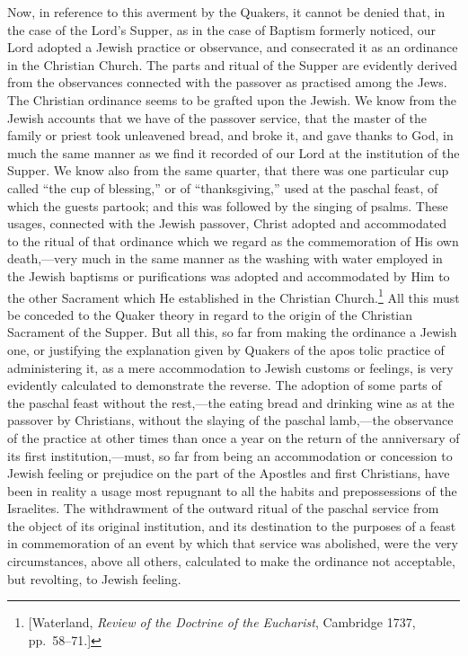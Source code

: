 \documentclass[english,]{book}
\begin{document}
Now, in reference to this averment by the Quakers, it cannot be denied that, in the case of the Lord's Supper, as in the case of Baptism formerly noticed, our Lord adopted a Jewish practice or observance, and consecrated it as an ordinance in the Christian Church. The parts and ritual of the Supper are evidently derived from the observances connected with the passover as practised among the Jews. The Christian ordinance seems to be grafted upon the Jewish. We know from the Jewish accounts that we have of the passover service, that the master of the family or priest took unleavened bread, and broke it, and gave thanks to God, in much the same manner as we find it recorded of our Lord at the institution of the Supper. We know also from the same quarter, that there was one particular cup called ``the cup of blessing,'' or of ``thanksgiving,'' used at the paschal feast, of which the guests partook; and this was followed by the singing of psalms. These usages, connected with the Jewish passover, Christ adopted and accommodated to the ritual of that ordinance which we regard as the commemoration of His own death,---very much in the same manner as the washing with water employed in the Jewish baptisms or purifications was adopted and accommodated by Him to the other Sacrament which He established in the Christian Church.\footnote{{[}Waterland, \emph{Review of the Doctrine of the Eucharist}, Cambridge 1737, pp.~58--71.{]}} All this must be conceded to the Quaker theory in regard to the origin of the Christian Sacrament of the Supper. But all this, so far from making the ordinance a Jewish one, or justifying the explanation given by Quakers of the apos tolic practice of administering it, as a mere accommodation to Jewish customs or feelings, is very evidently calculated to demonstrate the reverse. The adoption of some parts of the paschal feast without the rest,---the eating bread and drinking wine as at the passover by Christians, without the slaying of the paschal lamb,---the observance of the practice at other times than once a year on the return of the anniversary of its first institution,---must, so far from being an accommodation or concession to Jewish feeling or prejudice on the part of the Apostles and first Christians, have been in reality a usage most repugnant to all the habits and prepossessions of the Israelites. The withdrawment of the outward ritual of the paschal service from the object of its original institution, and its destination to the purposes of a feast in commemoration of an event by which that service was abolished, were the very circumstances, above all others, calculated to make the ordinance not acceptable, but revolting, to Jewish feeling.
\end{document}
